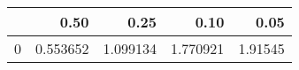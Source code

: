 \begin{tabular}{lrrrr}
\toprule
{} &      0.50 &      0.25 &      0.10 &     0.05 \\
\midrule
0 &  0.553652 &  1.099134 &  1.770921 &  1.91545 \\
\bottomrule
\end{tabular}
